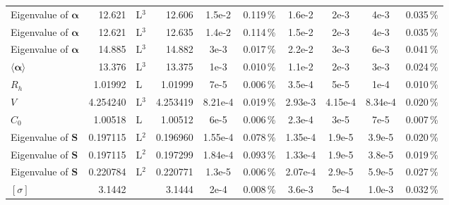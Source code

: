 \documentclass[12pt,letterpaper]{article}
\begin{document}
\begin{landscape}
\begin{center}
\begin{tabular}{ l d{2.8} l | d{2.8} c c c c c c }
Eigenvalue of $\mathbf{\alpha}$ & 12.621 & L$^{3}$ & 12.606& 1.5e-2& 0.119\,\%& 1.6e-2& 2e-3& 4e-3& 0.035\,\%\\ 
Eigenvalue of $\mathbf{\alpha}$ & 12.621 & L$^{3}$ & 12.635& 1.4e-2& 0.114\,\%& 1.5e-2& 2e-3& 4e-3& 0.035\,\%\\ 
Eigenvalue of $\mathbf{\alpha}$ & 14.885 & L$^{3}$ & 14.882& 3e-3& 0.017\,\%& 2.2e-2& 3e-3& 6e-3& 0.041\,\%\\ 
$\langle\mathbf{\alpha}\rangle$ & 13.376 & L$^{3}$ & 13.375& 1e-3& 0.010\,\%& 1.1e-2& 2e-3& 3e-3& 0.024\,\%\\ 
$R_{h}$ & 1.01992 & L & 1.01999& 7e-5& 0.006\,\%& 3.5e-4& 5e-5& 1e-4& 0.010\,\%\\ 
$V$ & 4.254240 & L$^{3}$ & 4.253419& 8.21e-4& 0.019\,\%& 2.93e-3& 4.15e-4& 8.34e-4& 0.020\,\%\\ 
$C_{0}$ & 1.00518 & L & 1.00512& 6e-5& 0.006\,\%& 2.3e-4& 3e-5& 7e-5& 0.007\,\%\\ 
Eigenvalue of $\mathbf{S}$ & 0.197115 & L$^{2}$ & 0.196960& 1.55e-4& 0.078\,\%& 1.35e-4& 1.9e-5& 3.9e-5& 0.020\,\%\\ 
Eigenvalue of $\mathbf{S}$ & 0.197115 & L$^{2}$ & 0.197299& 1.84e-4& 0.093\,\%& 1.33e-4& 1.9e-5& 3.8e-5& 0.019\,\%\\ 
Eigenvalue of $\mathbf{S}$ & 0.220784 & L$^{2}$ & 0.220771& 1.3e-5& 0.006\,\%& 2.07e-4& 2.9e-5& 5.9e-5& 0.027\,\%\\ 
$[\sigma]$ & 3.1442 &  & 3.1444& 2e-4& 0.008\,\%& 3.6e-3& 5e-4& 1.0e-3& 0.032\,\%\\
\end{tabular}
\end{center}

\pagebreak


\end{landscape}
\end{document}

